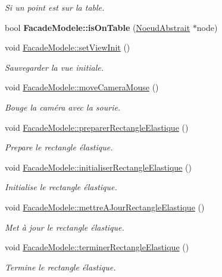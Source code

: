 \begin{DoxyCompactItemize}
\begin{DoxyCompactList}\small\item\em Si un point est sur la table. \end{DoxyCompactList}\item 
\hypertarget{group__inf2990_ga842a9426f91665baed35ec654cec6a20}{}bool {\bfseries Facade\+Modele\+::is\+On\+Table} (\hyperlink{class_noeud_abstrait}{Noeud\+Abstrait} $\ast$node)\label{group__inf2990_ga842a9426f91665baed35ec654cec6a20}

\item 
void \hyperlink{group__inf2990_gab3bc1f3520b17ed3d19287f3d411dd82}{Facade\+Modele\+::set\+View\+Init} ()
\begin{DoxyCompactList}\small\item\em Sauvegarder la vue initiale. \end{DoxyCompactList}\item 
void \hyperlink{group__inf2990_gaba7107809948a77f8ef3bf2240bc2bc4}{Facade\+Modele\+::move\+Camera\+Mouse} ()
\begin{DoxyCompactList}\small\item\em Bouge la caméra avec la sourie. \end{DoxyCompactList}\item 
void \hyperlink{group__inf2990_gaa5ea001f334158926e6c701478926ae9}{Facade\+Modele\+::preparer\+Rectangle\+Elastique} ()
\begin{DoxyCompactList}\small\item\em Prepare le rectangle élastique. \end{DoxyCompactList}\item 
void \hyperlink{group__inf2990_ga6ccf25bd92d3bae6dfeebaf051c768f4}{Facade\+Modele\+::initialiser\+Rectangle\+Elastique} ()
\begin{DoxyCompactList}\small\item\em Initialise le rectangle élastique. \end{DoxyCompactList}\item 
void \hyperlink{group__inf2990_ga382ae0540038d9ef65673af9d5d1b164}{Facade\+Modele\+::mettre\+A\+Jour\+Rectangle\+Elastique} ()
\begin{DoxyCompactList}\small\item\em Met à jour le rectangle élastique. \end{DoxyCompactList}\item 
void \hyperlink{group__inf2990_ga1c99d4d88f05b70a20b36b51c07f31cf}{Facade\+Modele\+::terminer\+Rectangle\+Elastique} ()
\begin{DoxyCompactList}\small\item\em Termine le rectangle élastique. \end{DoxyCompactList}\item 

\end{DoxyCompactItemize}

